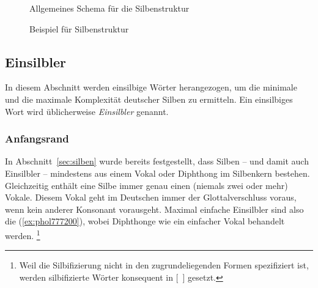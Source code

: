 \begin{figure}
  \centering
  \caption{Allgemeines Schema für die Silbenstruktur}
  \label{fig:silbenstruktur}
\end{figure}

\begin{figure}
  \centering
  \caption{Beispiel für Silbenstruktur}
  \label{fig:phonstr}
\end{figure}


\subsection{Einsilbler}

\label{sec:einsilbler}

In diesem Abschnitt werden einsilbige Wörter herangezogen, um die minimale und die maximale Komplexität deutscher Silben zu ermitteln.
Ein einsilbiges Wort wird üblicherweise \textit{Einsilbler} genannt.

\subsubsection{Anfangsrand}

\label{sec:anfangsrandeskriptiv}

In Abschnitt~\ref{sec:silben} wurde bereits festgestellt, dass Silben -- und damit auch Einsilbler -- mindestens aus einem Vokal oder Diphthong im Silbenkern bestehen.
Gleichzeitig enthält eine Silbe immer genau einen (niemals zwei oder mehr) Vokale.
Diesem Vokal geht im Deutschen immer der Glottalverschluss voraus, wenn kein anderer Konsonant vorausgeht.
Maximal einfache Einsilbler sind also die (\ref{ex:phol777200}), wobei Diphthonge wie ein einfacher Vokal behandelt werden.%
\footnote{Weil die Silbifizierung nicht in den zugrundeliegenden Formen spezifiziert ist, werden silbifizierte Wörter konsequent in [~] gesetzt.}

